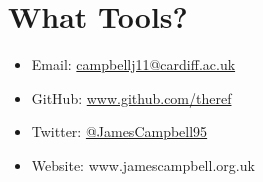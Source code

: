 \documentclass{beamer}
\begin{document}
\section{What Tools?}

\begin{frame}[standout]
  \begin{itemize}
    \itemsep2em
    \item Email: \href{mailto:campbellj11@cardiff.ac.uk}{campbellj11@cardiff.ac.uk}

    \item GitHub: \href{https://github.com/theref}{www.github.com/theref}

    \item Twitter: \href{https://twitter.com/JamesCampbell95}{@JamesCampbell95}

    \item Website: www.jamescampbell.org.uk
  \end{itemize}
\end{frame}
\end{document}
